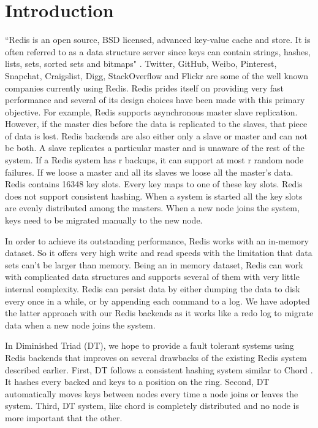 \documentclass[10pt,twocolumn,letterpaper]{article}
\begin{document}
\section{Introduction}
``Redis is an open source, BSD licensed, advanced key-value cache and store. It is often referred to as a data structure server since keys can contain strings, hashes, lists, sets, sorted sets and bitmaps"\cite{redis} . Twitter, GitHub, Weibo, Pinterest, Snapchat, Craigslist, Digg, StackOverflow and Flickr are some of the well known companies currently using Redis. Redis prides itself on providing very fast performance and several of its design choices have been made with this primary objective. For example, Redis supports asynchronous master slave replication. However, if the master dies before the data is replicated to the slaves, that piece of data is lost. Redis backends are also either only a slave or master and can not be both. A slave replicates a particular master and is unaware of the rest of the system. If a Redis system has r backups, it can support at most r random node failures. If we loose a master and all its slaves we loose all the master's data. Redis contains 16348 key slots. Every key maps to one of these key slots. Redis does not support consistent hashing. When a system is started all the key slots are evenly distributed among the masters.  When a new node joins the system, keys need to be migrated manually to the new node.

In order to achieve its outstanding performance, Redis works with an in-memory dataset. So it offers very high write and read speeds with the limitation that data sets can't be larger than memory. Being an in memory dataset, Redis can work with complicated data structures and supports several of them with very little internal complexity. Redis can persist data by either dumping the data to disk every once in a while, or by appending each command to a log. We have adopted the latter approach with our Redis backends as it works like a redo log to migrate data when a new node joins the system. 

In Diminished Triad (DT), we hope to provide a fault tolerant systems using Redis backends that improves on several drawbacks of the existing Redis system described earlier. First,  DT follows a consistent hashing system similar to Chord \cite{chord}. It hashes every backed and keys to a position on the ring. Second, DT automatically moves keys between nodes every time a node joins or leaves the system. Third, DT system, like chord is completely distributed and no node is more important that the other. 
\end{document}
